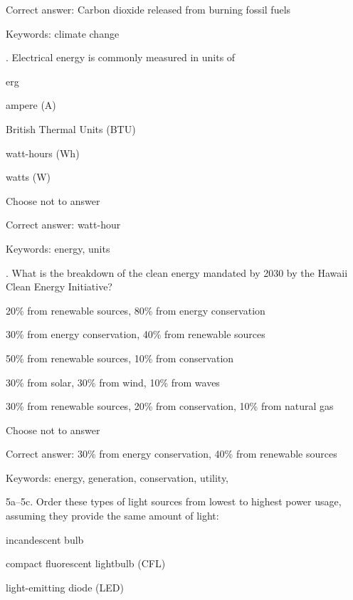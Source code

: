 Correct answer: Carbon dioxide released from burning fossil fuels

Keywords: climate change

\vspace{5 mm}
. Electrical energy is commonly measured in units of

\begin{answer}
	\item erg
	\item ampere (A)
	\item British Thermal Units (BTU)
	\item watt-hours (Wh)
	\item watts (W)
	\item Choose not to answer
\end{answer}

Correct answer: watt-hour

Keywords: energy, units

\vspace{5 mm}
. What is the breakdown of the clean energy mandated by 2030 by the Hawaii Clean Energy Initiative?

\begin{answer}
	\item 20\% from renewable sources, 80\% from energy conservation
	\item 30\% from energy conservation, 40\% from renewable sources
	\item 50\% from renewable sources, 10\% from conservation
	\item 30\% from solar, 30\% from wind, 10\% from waves
	\item 30\% from renewable sources, 20\% from conservation, 10\% from natural gas
	\item Choose not to answer
\end{answer}

Correct answer: 30\% from energy conservation, 40\% from renewable sources

Keywords: energy, generation, conservation, utility, \Hawaii

\vspace{5 mm}
\noindent
5a--5c. Order these types of light sources from lowest to highest power usage, assuming they provide the same amount of light:

\begin{answer}
	\item incandescent bulb
	\item compact fluorescent lightbulb (CFL)
	\item light-emitting diode (LED)
\end{answer}

